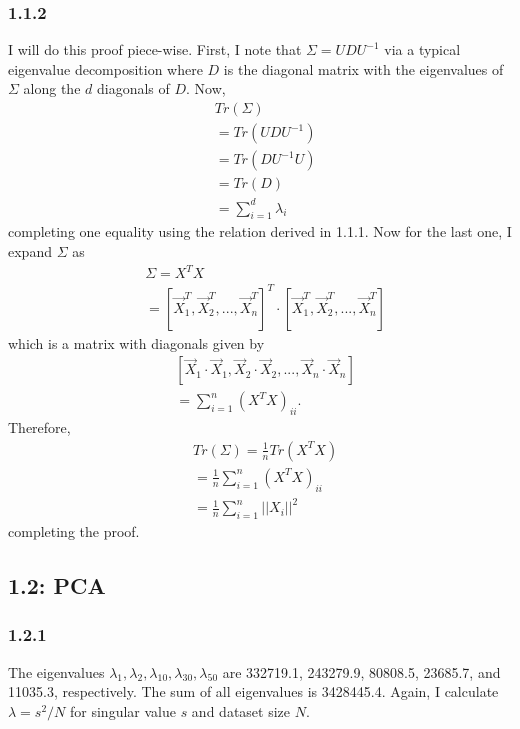 \documentclass[12pt]{amsart}
\begin{document}
\subsubsection*{1.1.2}
I will do this proof piece-wise.  First, I note that $\Sigma = UDU^{-1}$ via a typical eigenvalue decomposition where $D$ is the diagonal matrix with the eigenvalues of $\Sigma$ along the $d$ diagonals of $D$.  Now,
\begin{equation}
\begin{split}
& Tr(\Sigma) \\
& = Tr(UDU^{-1}) \\
& = Tr(DU^{-1}U) \\
& = Tr(D) \\
& = \sum_{i = 1}^d \lambda_i
\end{split}
\end{equation}
completing one equality using the relation derived in 1.1.1.  Now for the last one, I expand $\Sigma$ as
\begin{equation}
\begin{split}
& \Sigma = X^TX \\
& = [\vec{X}_1^T, \vec{X}_2^T, ..., \vec{X}_n^T]^T \cdot [\vec{X}_1^T, \vec{X}_2^T, ..., \vec{X}_n^T]
\end{split}
\end{equation}
which is a matrix with diagonals given by
\begin{equation}
\begin{split}
& [\vec{X}_1 \cdot \vec{X}_1, \vec{X}_2 \cdot \vec{X}_2, ..., \vec{X}_n \cdot \vec{X}_n] \\
& = \sum_{i = 1}^n (X^TX)_{ii}.
\end{split}
\end{equation}
Therefore, 
\begin{equation}
\begin{split}
& Tr(\Sigma) = \frac{1}{n}Tr(X^TX) \\
& = \frac{1}{n}\sum_{i = 1}^n (X^TX)_{ii} \\
& = \frac{1}{n} \sum_{i = 1}^n ||X_i||^2
\end{split}
\end{equation}
completing the proof.

\subsection*{1.2: PCA}
\subsubsection*{1.2.1}
The eigenvalues $\lambda_1, \lambda_2, \lambda_{10}, \lambda_{30}, \lambda_{50}$ are 332719.1, 243279.9, 80808.5, 23685.7, and 11035.3, respectively. The sum of all eigenvalues is 3428445.4.  Again, I calculate $\lambda = s^2/N$ for singular value $s$ and dataset size $N$.
\end{document}
